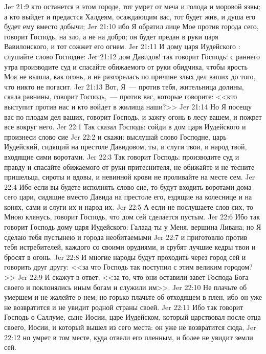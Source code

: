 \vs Jer 21:9 кто останется в этом городе, тот умрет от меча и голода и моровой язвы; а кто выйдет и предастся Халдеям, осаждающим вас, тот будет жив, и душа его будет ему вместо добычи;
\vs Jer 21:10 ибо Я обратил лице Мое против города сего, говорит Господь, на зло, а не на добро; он будет предан в руки царя Вавилонского, и тот сожжет его огнем.
\rsbpar\vs Jer 21:11 И дому царя Иудейского : слушайте слово Господне:
\vs Jer 21:12 дом Давидов! так говорит Господь: с раннего утра производите суд и спасайте обижаемого от руки обидчика, чтобы ярость Моя не вышла, как огонь, и не разгорелась по причине злых дел ваших до того, что никто не погасит.
\vs Jer 21:13 Вот, Я~--- против тебя, жительница долины, скала равнины, говорит Господь,~--- против вас, которые говорите: <<кто выступит против нас и кто войдет в жилища наши?>>
\vs Jer 21:14 Но Я посещу вас по плодам дел ваших, говорит Господь, и зажгу огонь в лесу вашем, и пожрет все вокруг него.
\vs Jer 22:1 Так сказал Господь: сойди в дом царя Иудейского и произнеси слово сие
\vs Jer 22:2 и скажи: выслушай слово Господне, царь Иудейский, сидящий на престоле Давидовом, ты, и слуги твои, и народ твой, входящие сими воротами.
\vs Jer 22:3 Так говорит Господь: производите суд и правду и спасайте обижаемого от руки притеснителя, не обижайте и не тесните пришельца, сироты и вдовы, и невинной крови не проливайте на месте сем.
\vs Jer 22:4 Ибо если вы будете исполнять слово сие, то будут входить воротами дома сего цари, сидящие вместо Давида на престоле его, ездящие на колеснице и на конях, сами и слуги их и народ их.
\vs Jer 22:5 А если не послушаете слов сих, то Мною клянусь, говорит Господь, что дом сей сделается пустым.
\vs Jer 22:6 Ибо так говорит Господь дому царя Иудейского: Галаад ты у Меня, вершина Ливана; но Я сделаю тебя пустынею и города необитаемыми
\vs Jer 22:7 и приготовлю против тебя истребителей, каждого со своими орудиями, и срубят лучшие кедры твои и бросят в огонь.
\vs Jer 22:8 И многие народы будут проходить через город сей и говорить друг другу: <<за что Господь так поступил с этим великим городом?>>
\vs Jer 22:9 И скажут в ответ: <<за то, что они оставили завет Господа Бога своего и поклонялись иным богам и служили им>>.
\vs Jer 22:10 Не плачьте об умершем и не жалейте о нем; но горько плачьте об отходящем в плен, ибо он уже не возвратится и не увидит родной страны своей.
\vs Jer 22:11 Ибо так говорит Господь о Саллуме, сыне Иосии, царе Иудейском, который царствовал после отца своего, Иосии, и который вышел из сего места: он уже не возвратится сюда,
\vs Jer 22:12 но умрет в том месте, куда отвели его пленным, и более не увидит земли сей.
